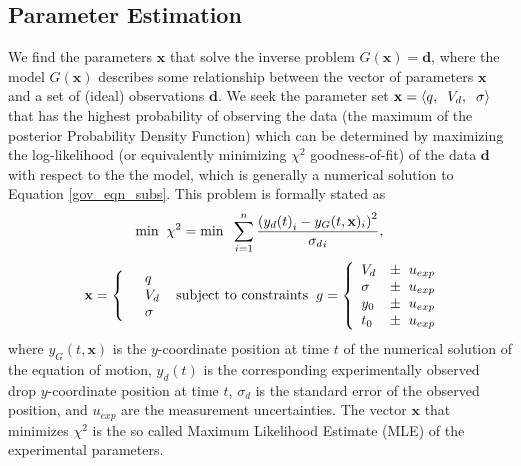 \documentclass[aip,reprint, floatfix]{revtex4-1}
\begin{document}
\subsection{Parameter Estimation}
We find the parameters $\mathbf{x}$ that solve the inverse problem $G(\mathbf{x}) = \mathbf{d}$, where the model $G(\mathbf{x})$ describes some relationship between the vector of parameters $\mathbf{x}$ and a set of (ideal) observations $\mathbf{d}$. We seek the parameter set $\mathbf{x} = \left\langle q, \hspace{2 mm} V_d, \hspace{2 mm} \sigma \right\rangle$ that has the highest probability of observing the data (the maximum of the posterior Probability Density Function) which can be determined by maximizing the log-likelihood (or equivalently minimizing $\chi^2$ goodness-of-fit) of the data $\mathbf{d}$ with respect to the the model, which is generally a numerical solution to Equation \ref{gov_eqn_subs}. This problem is formally stated as  
\[
\mbox{min} \hspace{2 mm} \chi^2 = \mbox{min} \hspace{2 mm} \sum^n_{i=1} \frac{\left({y_d(t)}_i - y_G(t, \mathbf{x})_i \right)^2}{{\sigma_d}_i},
\]
\begin{eqnarray*} \mbox{} \hspace{2 mm} \begin{split} \mathbf{x} = \left\{ \begin{array}{ll}      & q\\
		  &	V_d\\
          & \sigma 
          \end{array} \right. 
          \end{split} \hspace{2 mm} \mbox{subject to constraints} \hspace{2 mm} \begin{split}
          g = \left\{ \begin{array}{ll}
           V_d &\pm \hspace{2 mm} u_{exp}\\
      	   \sigma &\pm  \hspace{2 mm} u_{exp}\\
      	   y_0 &\pm \hspace{2 mm} u_{exp}\\
      	   t_0 &\pm \hspace{2 mm} u_{exp}\\
          \end{array} \right. 
          \end{split}
\end{eqnarray*}
where $y_G(t, \mathbf{x})$ is the $y$-coordinate position at time $t$ of the numerical solution of the equation of motion, $y_d(t)$ is the corresponding experimentally observed drop $y$-coordinate position at time $t$, $\sigma_d$ is the standard error of the observed position, and $u_{exp}$ are the measurement uncertainties. The vector $\mathbf{x}$ that minimizes $\chi^2$ is the so called Maximum Likelihood Estimate (MLE) of the experimental parameters.
\end{document}
